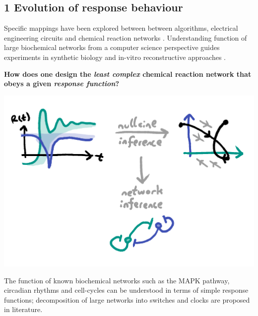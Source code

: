 \documentclass[a0,portrait]{a0poster}
\begin{document}
\begin{multicols}{3} %

\section*{1 Evolution of response behaviour}

Specific mappings have been explored between between algorithms, electrical
engineering circuits and chemical reaction networks \cite{Dalchau2014ComputationalNetworks}. Understanding function
of large biochemical networks from a computer science perspective guides experiments
in synthetic biology and in-vitro reconstructive approaches \cite{Loose2011MinMinE}.
\\
\begin{tcolorbox}[boxrule=2pt,arc=3.4pt,boxsep=2mm]
\begin{center}\color{DarkRed}
\textbf{How does one design the \textit{least complex} chemical
reaction network that obeys a given \textit{response function}?}
\end{center}
\end{tcolorbox}
\begin{center}
\includegraphics[width=1.0\linewidth]{inference}
\end{center}\noindent
The function of known biochemical networks such as the MAPK pathway,
circadian rhythms and cell-cycles can be understood in terms of simple
response functions; decomposition of large networks into switches and
clocks are proposed in literature.
\\\\

\end{multicols}
\end{document}
